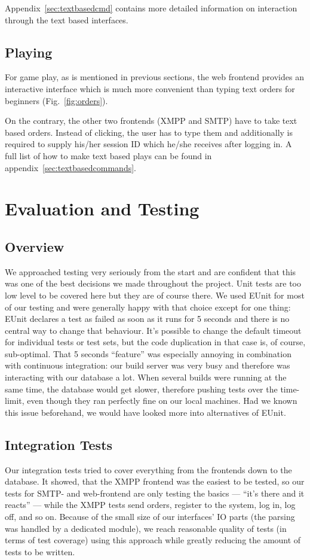 \documentclass[11pt,a4paper]{report}
\newcommand{\hi}[1]{{\color{red}\em #1\/}\\}
\begin{document}
Appendix~\ref{sec:textbasedcmd} contains more detailed information on
interaction through the text based interfaces.

\section{Playing}
For game play, as is mentioned in previous sections, the web frontend provides
an interactive interface which is much more convenient than typing text orders
for beginners (Fig.~\ref{fig:orders}).

On the contrary, the other two frontends (XMPP and SMTP) have to take text
based orders. Instead of clicking, the user has to type them and additionally
is required to supply his/her session ID which he/she receives after logging in.
A full list of how to make text based plays can be found in
appendix~\ref{sec:textbasedcommands}.

\chapter{Evaluation and Testing}
\section{Overview}
We approached testing very seriously from the start and are confident that this
was one of the best decisions we made throughout the project. Unit tests are too
low level to be covered here but they are of course there. We used EUnit for
most of our testing and were generally happy with that choice except for one
thing: EUnit declares a test as failed as soon as it runs for 5 seconds and
there is no central way to change that behaviour. It's possible to change the
default timeout for individual tests or test sets, but the code duplication in
that case is, of course, sub-optimal.
That 5 seconds ``feature'' was especially annoying in combination with
continuous integration: our build server was very busy and therefore was
interacting with our database a lot. When several builds were running at the
same time, the database would get slower, therefore pushing tests over the
time-limit, even though they ran perfectly fine on our local machines. Had we
known this issue beforehand, we would have looked more into alternatives of
EUnit.

\section{Integration Tests}
Our integration tests tried to cover everything from the frontends down to the
database. It showed, that the XMPP frontend was the easiest to be tested, so
our tests for SMTP- and web-frontend are only testing the basics --- ``it's
there and it reacts'' --- while the XMPP tests send orders, register to the
system, log in, log off, and so on. Because of the small size of our interfaces' IO
parts (the parsing was handled by a dedicated module), we reach reasonable quality
of tests (in terms of test coverage) using this approach while greatly reducing the
amount of tests to be written.
\end{document}
